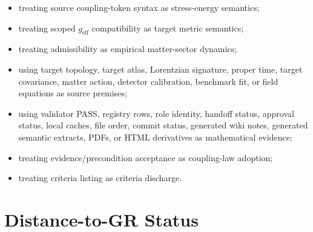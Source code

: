 \documentclass[11pt]{article}
\newcommand{\geff}{g_{\mathrm{eff}}}
\begin{document}
\begin{itemize}[leftmargin=*]
  \item treating source coupling-token syntax as stress-energy semantics;
  \item treating scoped \(\geff\) compatibility as target metric semantics;
  \item treating admissibility as empirical matter-sector dynamics;
  \item using target topology, target atlas, Lorentzian signature, proper
  time, target covariance, matter action, detector calibration, benchmark fit,
  or field equations as source premises;
  \item using validator PASS, registry rows, role identity, handoff status,
  approval status, local caches, file order, commit status, generated wiki
  notes, generated semantic extracts, PDFs, or HTML derivatives as
  mathematical evidence;
  \item treating evidence/precondition acceptance as coupling-law adoption;
  \item treating criteria listing as criteria discharge.
\end{itemize}

\section{Distance-to-GR Status}
\end{document}
